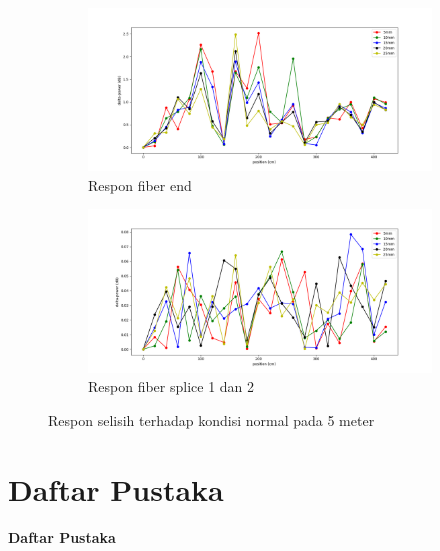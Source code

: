 \documentclass[12pt]{article}
\begin{document}
	\begin{figure}[h!]
		\centering
		\captionsetup{justification=centering}
		\begin{subfigure}[b]{0.6\textwidth}
			\includegraphics[width=\textwidth]{images/Bab_4/Bab_4_5g1}	
			\caption{\small{Respon fiber end}}		
		\end{subfigure}
		\begin{subfigure}[b]{0.6\textwidth}
			\includegraphics[width=\linewidth]{images/Bab_4/Bab_4_5g2}
			\caption{\small{Respon fiber splice 1 dan 2}}			
		\end{subfigure}
		\caption[Uji Pagar]{\small{Respon selisih terhadap kondisi normal pada 5 meter}}
	\end{figure}


\newpage

	\section{Daftar Pustaka}
	
	\begin{center}
		\textbf{Daftar Pustaka}
	\end{center}
	
	
	

	
\end{document}
